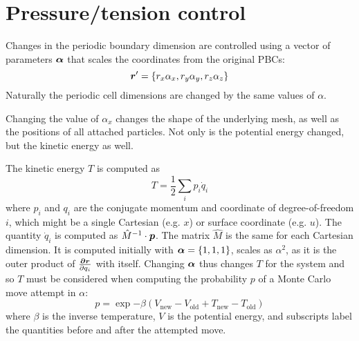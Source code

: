 
\section{ Pressure/tension control } \label{sec:npt}

Changes in the periodic boundary dimension are controlled using a vector of parameters $\boldsymbol{\alpha}$ that scales the coordinates from the original PBCs:
\begin{equation}
\boldsymbol{r}' = \{ r_x \alpha_x, r_y \alpha_y, r_z \alpha_z \}
\end{equation} 
Naturally the periodic cell dimensions are changed by the same values of $\alpha$.

Changing the value of $\alpha_x$ changes the shape of the underlying mesh, as well as the positions of all attached particles.
Not only is the potential energy changed, but the kinetic energy as well.

The kinetic energy $T$ is computed as
\begin{equation}
T = \frac{1}{2} \sum_i p_i \dot{q}_i
\end{equation}
where $p_i$ and $q_i$ are the conjugate momentum and coordinate of degree-of-freedom $i$, which might be a single Cartesian (e.g. $x$) or surface coordinate (e.g. $u$).
The quantity $\dot{q}_i$ is computed as $\hat{M}^{-1} \cdot \boldsymbol{p}$.
The matrix $\hat{M}$ is the same for each Cartesian dimension.
It is computed initially with $\boldsymbol{\alpha}=\{1,1,1\}$, scales as $\alpha^2$, as it is the outer product of $\frac{\boldsymbol{\partial r}}{\partial q_i}$ with itself.
Changing $\boldsymbol{\alpha}$ thus changes $T$ for the system and so $T$ must be considered when computing the probability $p$ of a Monte Carlo move attempt in $\alpha$:
\begin{equation}
p = \exp{-\beta (V_\textrm{new}-V_\textrm{old}+T_\textrm{new}-T_\textrm{old})}
\end{equation} 
where $\beta$ is the inverse temperature, $V$ is the potential energy, and subscripts label the quantities before and after the attempted move. 
